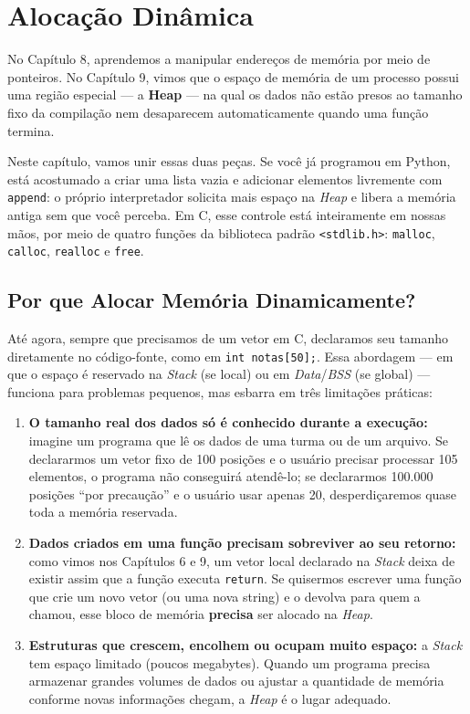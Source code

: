 \chapter{Alocação Dinâmica}

No Capítulo 8, aprendemos a manipular endereços de memória por meio de ponteiros. No Capítulo 9, vimos que o espaço de memória de um processo possui uma região especial — a \textbf{Heap} — na qual os dados não estão presos ao tamanho fixo da compilação nem desaparecem automaticamente quando uma função termina.

Neste capítulo, vamos unir essas duas peças. Se você já programou em Python, está acostumado a criar uma lista vazia e adicionar elementos livremente com \texttt{append}: o próprio interpretador solicita mais espaço na \textit{Heap} e libera a memória antiga sem que você perceba. Em C, esse controle está inteiramente em nossas mãos, por meio de quatro funções da biblioteca padrão \texttt{<stdlib.h>}: \texttt{malloc}, \texttt{calloc}, \texttt{realloc} e \texttt{free}.

\section{Por que Alocar Memória Dinamicamente?}
\label{sec:por-que-alocar}

Até agora, sempre que precisamos de um vetor em C, declaramos seu tamanho diretamente no código-fonte, como em \texttt{int notas[50];}. Essa abordagem — em que o espaço é reservado na \textit{Stack} (se local) ou em \textit{Data}/\textit{BSS} (se global) — funciona para problemas pequenos, mas esbarra em três limitações práticas:

\begin{enumerate}
    \item \textbf{O tamanho real dos dados só é conhecido durante a execução:} imagine um programa que lê os dados de uma turma ou de um arquivo. Se declararmos um vetor fixo de 100 posições e o usuário precisar processar 105 elementos, o programa não conseguirá atendê-lo; se declararmos 100.000 posições ``por precaução'' e o usuário usar apenas 20, desperdiçaremos quase toda a memória reservada.
    \item \textbf{Dados criados em uma função precisam sobreviver ao seu retorno:} como vimos nos Capítulos 6 e 9, um vetor local declarado na \textit{Stack} deixa de existir assim que a função executa \texttt{return}. Se quisermos escrever uma função que crie um novo vetor (ou uma nova string) e o devolva para quem a chamou, esse bloco de memória \textbf{precisa} ser alocado na \textit{Heap}.
    \item \textbf{Estruturas que crescem, encolhem ou ocupam muito espaço:} a \textit{Stack} tem espaço limitado (poucos megabytes). Quando um programa precisa armazenar grandes volumes de dados ou ajustar a quantidade de memória conforme novas informações chegam, a \textit{Heap} é o lugar adequado.
\end{enumerate}

